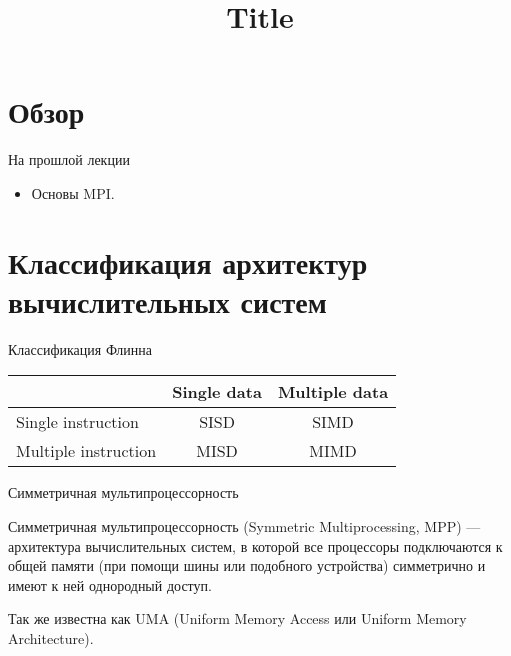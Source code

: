 

\title{Title}



\begin{frame}
\titlepage
\end{frame}

\section{Обзор}

\begin{frame}
\tableofcontents
\end{frame} 

\begin{frame}{На прошлой лекции}

\begin{itemize}
    \item Основы MPI.
\end{itemize}

\end{frame}

\section{Классификация архитектур вычислительных систем}

\begin{frame}{Классификация Флинна}

\begin{table}[htp]
    \begin{center}
    \begin{tabular}{|l|c|c|}
        \hline
                                & Single data   & Multiple data \\
        \hline
        Single instruction      & SISD          & SIMD \\
        \hline
        Multiple instruction    & MISD          & MIMD \\
        \hline
    \end{tabular}
    \end{center}
\end{table}

\end{frame}

\begin{frame}{Симметричная мультипроцессорность}

Симметричная мультипроцессорность (\abbr Symmetric Multiprocessing, MPP) --- архитектура вычислительных систем, в которой все процессоры подключаются к общей памяти (при помощи шины или подобного устройства) симметрично и имеют к ней однородный доступ.

Так же известна как UMA (Uniform Memory Access или Uniform Memory Architecture).

\end{frame}


